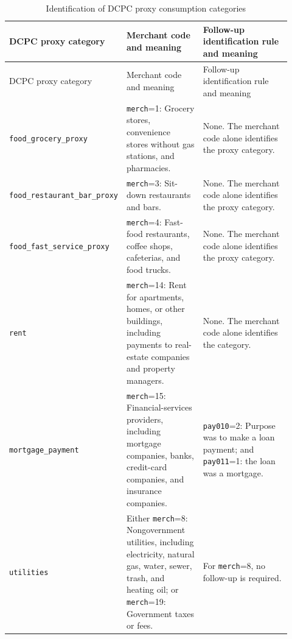 \documentclass[11pt]{article}
\newcommand{\code}[1]{\nolinkurl{#1}}
\begin{document}
\begin{landscape}
	\footnotesize
	\setlength{\tabcolsep}{5pt}
	\renewcommand{\arraystretch}{1.25}
	
	\begin{longtable}{
			>{\RaggedRight\arraybackslash}p{0.20\linewidth}
			>{\RaggedRight\arraybackslash}p{0.31\linewidth}
			>{\RaggedRight\arraybackslash}p{0.41\linewidth}
		}
		\caption{Identification of DCPC proxy consumption categories}
		\label{tab:dcpc-category-identification}\\
		
		\toprule
		DCPC proxy category &
		Merchant code and meaning &
		Follow-up identification rule and meaning \\
		\midrule
		\endfirsthead
		
		\toprule
		DCPC proxy category &
		Merchant code and meaning &
		Follow-up identification rule and meaning \\
		\midrule
		\endhead
		
		\bottomrule
		\endfoot
		
		\code{food_grocery_proxy} &
		\code{merch}=1: Grocery stores, convenience stores without gas stations,
		and pharmacies. &
		None. The merchant code alone identifies the proxy category. \\
		
		\code{food_restaurant_bar_proxy} &
		\code{merch}=3: Sit-down restaurants and bars. &
		None. The merchant code alone identifies the proxy category. \\
		
		\code{food_fast_service_proxy} &
		\code{merch}=4: Fast-food restaurants, coffee shops, cafeterias, and
		food trucks. &
		None. The merchant code alone identifies the proxy category. \\
		
		\code{rent} &
		\code{merch}=14: Rent for apartments, homes, or other buildings,
		including payments to real-estate companies and property managers. &
		None. The merchant code alone identifies the category. \\
		
		\code{mortgage_payment} &
		\code{merch}=15: Financial-services providers, including mortgage
		companies, banks, credit-card companies, and insurance companies. &
		\code{pay010}=2: Purpose was to make a loan payment; and
		\code{pay011}=1: the loan was a mortgage. \\
		
		\code{utilities} &
		Either \code{merch}=8: Nongovernment utilities, including electricity,
		natural gas, water, sewer, trash, and heating oil; or
		\code{merch}=19: Government taxes or fees. &
		For \code{merch}=8, no follow-up is required.
		

\end{longtable}
\end{landscape}
\end{document}
